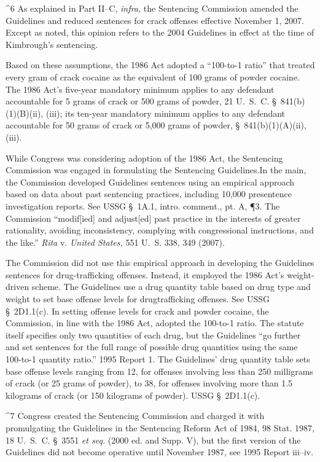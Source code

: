 {^6 As explained in Part II--C, \emph{infra,} the Sentencing Commission
amended the Guidelines and reduced sentences for crack offenses
effective November 1, 2007. Except as noted, this opinion refers to the
2004 Guidelines in effect at the time of Kimbrough's sentencing.

  Based on these assumptions, the 1986 Act adopted a ``100-to-1
ratio'' that treated every gram of crack cocaine as the equivalent
of 100 grams of powder cocaine. The 1986 Act's five-year mandatory
minimum applies to any defendant accountable for 5 grams of crack or
500 grams of powder, 21 U.~S.~C. \S~841(b)(1)(B)(ii), (iii); its
ten-year mandatory minimum applies to any defendant accountable for
50 grams of crack or 5,000 grams of powder, \S~841(b)(1)(A)(ii),
(iii).

  While Congress was considering adoption of the 1986 Act, the
Sentencing Commission was engaged in formulating the Sentencing
Guidelines.\footnotemark[7] In the main, the Commission developed Guidelines
sentences using an empirical approach based on data about past
sentencing practices, including 10,000 presentence investigation
reports. See USSG \S~1A.1, intro. comment., pt. A, ¶3. The
Commission ``modif[ied] and adjust[ed] past practice in the interests
of greater rationality, avoiding inconsistency, complying with
congressional instructions, and the like.'' \emph{Rita} v. \emph{United
States,} 551 U.~S. 338, 349 (2007).

  The Commission did not use this empirical approach in developing the
Guidelines sentences for drug-trafficking offenses. Instead, it employed
the 1986 Act's weight-driven scheme. The Guidelines use a drug
quantity table based on drug type and weight to set base offense levels
for drugtrafficking offenses. See USSG \S~2D1.1(c). In setting
of\newpage  fense levels for crack and powder cocaine, the Commission, in
line with the 1986 Act, adopted the 100-to-1 ratio. The statute itself
specifies only two quantities of each drug, but the Guidelines ``go
further and set sentences for the full range of possible drug quantities
using the same 100-to-1 quantity ratio.'' 1995 Report 1. The
Guidelines' drug quantity table sets base offense levels ranging from
12, for offenses involving less than 250 milligrams of crack (or 25
grams of powder), to 38, for offenses involving more than 1.5 kilograms
of crack (or 150 kilograms of powder). USSG \S~2D1.1(c).\footnotemark[8]

^7 Congress created the Sentencing Commission and charged it with
promulgating the Guidelines in the Sentencing Reform Act of 1984, 98
Stat. 1987, 18 U.~S.~C. \S~3551 \emph{et seq.} (2000 ed. and Supp. V),
but the first version of the Guidelines did not become operative until
November 1987, see 1995 Report iii--iv.

}
